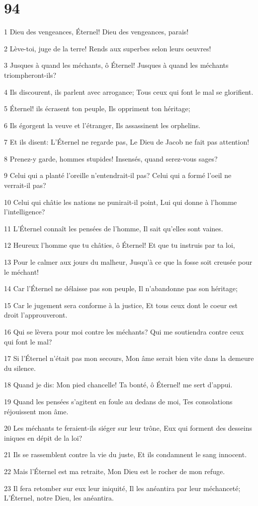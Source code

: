 \chapter{94}

\par 1 Dieu des vengeances, Éternel! Dieu des vengeances, parais!
\par 2 Lève-toi, juge de la terre! Rends aux superbes selon leurs oeuvres!
\par 3 Jusques à quand les méchants, ô Éternel! Jusques à quand les méchants triompheront-ils?
\par 4 Ils discourent, ils parlent avec arrogance; Tous ceux qui font le mal se glorifient.
\par 5 Éternel! ils écrasent ton peuple, Ils oppriment ton héritage;
\par 6 Ils égorgent la veuve et l'étranger, Ils assassinent les orphelins.
\par 7 Et ils disent: L'Éternel ne regarde pas, Le Dieu de Jacob ne fait pas attention!
\par 8 Prenez-y garde, hommes stupides! Insensés, quand serez-vous sages?
\par 9 Celui qui a planté l'oreille n'entendrait-il pas? Celui qui a formé l'oeil ne verrait-il pas?
\par 10 Celui qui châtie les nations ne punirait-il point, Lui qui donne à l'homme l'intelligence?
\par 11 L'Éternel connaît les pensées de l'homme, Il sait qu'elles sont vaines.
\par 12 Heureux l'homme que tu châties, ô Éternel! Et que tu instruis par ta loi,
\par 13 Pour le calmer aux jours du malheur, Jusqu'à ce que la fosse soit creusée pour le méchant!
\par 14 Car l'Éternel ne délaisse pas son peuple, Il n'abandonne pas son héritage;
\par 15 Car le jugement sera conforme à la justice, Et tous ceux dont le coeur est droit l'approuveront.
\par 16 Qui se lèvera pour moi contre les méchants? Qui me soutiendra contre ceux qui font le mal?
\par 17 Si l'Éternel n'était pas mon secours, Mon âme serait bien vite dans la demeure du silence.
\par 18 Quand je dis: Mon pied chancelle! Ta bonté, ô Éternel! me sert d'appui.
\par 19 Quand les pensées s'agitent en foule au dedans de moi, Tes consolations réjouissent mon âme.
\par 20 Les méchants te feraient-ils siéger sur leur trône, Eux qui forment des desseins iniques en dépit de la loi?
\par 21 Ils se rassemblent contre la vie du juste, Et ils condamnent le sang innocent.
\par 22 Mais l'Éternel est ma retraite, Mon Dieu est le rocher de mon refuge.
\par 23 Il fera retomber sur eux leur iniquité, Il les anéantira par leur méchanceté; L'Éternel, notre Dieu, les anéantira.

